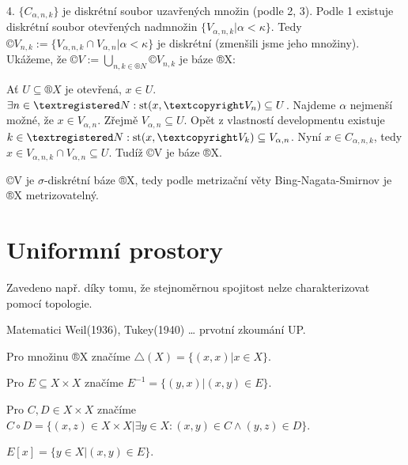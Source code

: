 \documentclass[12pt]{article}                   %
\begin{document}
\begin{veta}[Bing]
\begin{dukazin}
            4. $\{C_{\alpha, n, k}\}$ je diskrétní soubor uzavřených množin (podle 2, 3). Podle 1 existuje diskrétní soubor otevřených nadmnožin $\{V_{\alpha, n, k} | \alpha < \kappa\}$. Tedy $©V_{n, k} := \{V_{\alpha, n, k} \cap V_{\alpha, n} | \alpha < \kappa\}$ je diskrétní (zmenšili jsme jeho množiny). Ukážeme, že $©V := \bigcup_{n, k \in ®N} ©V_{n, k}$ je báze ®X:

            Ať $U \subseteq ®X$ je otevřená, $x \in U$. $\exists n \in ®N: \st(x, ©V_n) \subseteq U$. Najdeme $\alpha$ nejmenší možné, že $x \in V_{\alpha, n}$. Zřejmě $V_{\alpha, n} \subseteq U$. Opět z vlastností developmentu existuje $k \in ®N: \st(x, ©V_k) \subseteq V_{\alpha, n}$. Nyní $x \in C_{\alpha, n, k}$, tedy $x \in V_{\alpha, n, k} \cap V_{\alpha, n} \subseteq U$. Tudíž ©V je báze ®X.

            ©V je $\sigma$-diskrétní báze ®X, tedy podle metrizační věty Bing-Nagata-Smirnov je ®X metrizovatelný.
        \end{dukazin}
    \end{veta}

\section{Uniformní prostory}
    \begin{poznamka}
        Zavedeno např. díky tomu, že stejnoměrnou spojitost nelze charakterizovat pomocí topologie.

        Matematici Weil(1936), Tukey(1940) … prvotní zkoumání UP.
    \end{poznamka}

    \begin{definice}[Značení]
        Pro množinu ®X značíme $\triangle(X) = \{(x, x) | x \in X\}$.

        Pro $E \subseteq X \times X$ značíme $E^{-1} = \{(y, x) | (x, y) \in E\}$.

        Pro $C, D \in X \times X$ značíme $C \circ D = \{(x, z) \in X \times X | \exists y \in X: (x, y) \in C \land (y, z) \in D\}$.

        $E[x] = \{y \in X | (x, y) \in E\}$.
    \end{definice}
\end{document}
